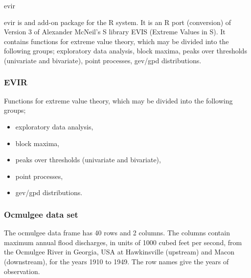 \documentclass[MAIN.tex]{subfiles}
\begin{document}
\begin{frame}
	evir
	
	evir is and add-on package for the R system. It is an R port (conversion) of Version 3 of Alexander McNeil's S library EVIS (Extreme Values in S). It contains functions for extreme value theory, which may be divided into the following groups; exploratory data analysis, block maxima, peaks over thresholds (univariate and bivariate), point processes, gev/gpd distributions.
\end{frame}

\begin{frame}
\frametitle{EVIR}

Functions for extreme value theory, which may be divided into the following groups;
\begin{itemize}
	\item exploratory data analysis,
	\item block maxima,
	\item peaks over thresholds (univariate and bivariate),
	\item point processes,
	\item gev/gpd distributions.
\end{itemize}
\end{frame}
\begin{frame}
\frametitle{Ocmulgee data set}

The ocmulgee data frame has 40 rows and 2 columns.
The columns contain maximum annual flood discharges, in units of 1000 cubed feet per second, from the Ocmulgee River in Georgia, USA at Hawkinsville (upstream) and Macon (downstream), for the years 1910 to 1949. The row names give the years of observation.
\end{frame}
\end{document}
